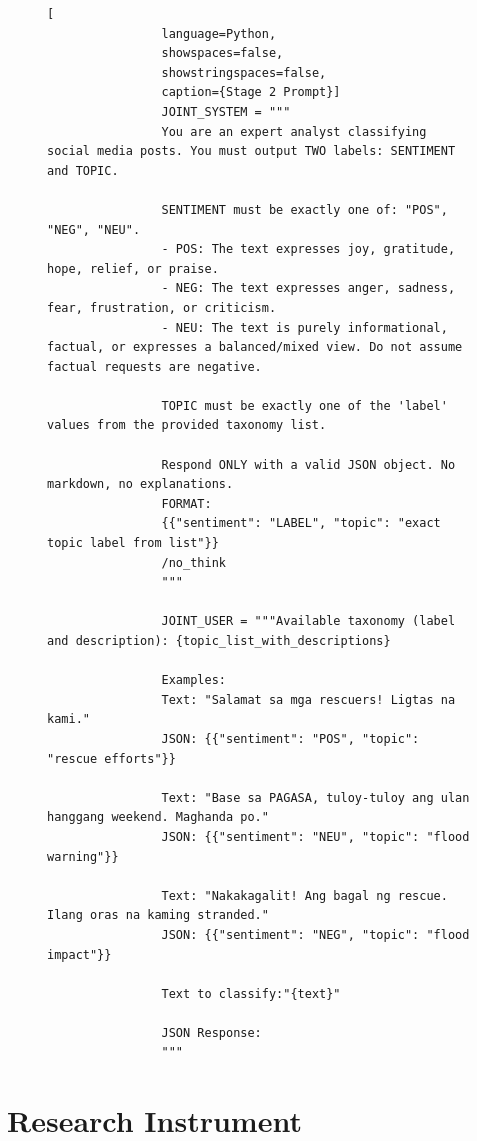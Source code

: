 \documentclass[12pt,a4paper]{report}
\begin{document}
	\newpage
	\begin{figure}[htbp]
		\centering
		\hypertarget{lk:stage-2-prompt}{}
		\label{ls:stage-2-prompt}
		\begin{minipage}{0.9\textwidth}
			\begin{lstlisting}[
				language=Python,
				showspaces=false,
				showstringspaces=false,
				caption={Stage 2 Prompt}]
				JOINT_SYSTEM = """
				You are an expert analyst classifying social media posts. You must output TWO labels: SENTIMENT and TOPIC.
				
				SENTIMENT must be exactly one of: "POS", "NEG", "NEU".
				- POS: The text expresses joy, gratitude, hope, relief, or praise.
				- NEG: The text expresses anger, sadness, fear, frustration, or criticism.
				- NEU: The text is purely informational, factual, or expresses a balanced/mixed view. Do not assume factual requests are negative.
				
				TOPIC must be exactly one of the 'label' values from the provided taxonomy list.
				
				Respond ONLY with a valid JSON object. No markdown, no explanations.
				FORMAT:
				{{"sentiment": "LABEL", "topic": "exact topic label from list"}}
				/no_think
				"""
				
				JOINT_USER = """Available taxonomy (label and description): {topic_list_with_descriptions}
				
				Examples:
				Text: "Salamat sa mga rescuers! Ligtas na kami."
				JSON: {{"sentiment": "POS", "topic": "rescue efforts"}}
				
				Text: "Base sa PAGASA, tuloy-tuloy ang ulan hanggang weekend. Maghanda po."
				JSON: {{"sentiment": "NEU", "topic": "flood warning"}}
				
				Text: "Nakakagalit! Ang bagal ng rescue. Ilang oras na kaming stranded."
				JSON: {{"sentiment": "NEG", "topic": "flood impact"}}
				
				Text to classify:"{text}"
				
				JSON Response:
				"""
			\end{lstlisting}
		\end{minipage}
	\end{figure}
	
	\newpage
	\section*{Research Instrument}
	\hypertarget{lk:resaerch-instrument}{}
	\label{app:research-instrument}
	
\end{document}
